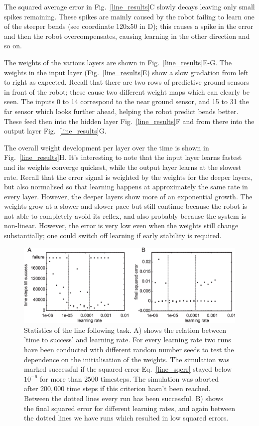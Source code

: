 \documentclass{aamas2018}
\begin{document}
The squared average error in Fig.~\ref{line_results}C slowly decays
leaving only small spikes remaining. These spikes are mainly caused by 
the robot failing to learn one of the steeper bends (see
coordinate 120x50 in D); this causes a spike in the error and
then the robot overcompensates, causing learning in the
other direction and so on.

The weights of the various layers are shown in
Fig.~\ref{line_results}E-G.  The weights in the input layer
(Fig.~\ref{line_results}E) show a slow gradation  from left to right as
expected. Recall that there are two rows of predictive ground
sensors in front of the robot; these cause two different weight maps
which can clearly be seen. The inputs 0 to 14 correspond to the near
ground sensor, and 15 to 31 the far sensor which looks further ahead, 
helping the robot predict bends better. These feed then into the 
hidden layer Fig.~\ref{line_results}F
and from there into the output layer Fig.~\ref{line_results}G.

The overall weight development per layer over the time 
is shown in Fig.~\ref{line_results}H. It's interesting to note
that the input layer learns fastest and its weights converge
quickest, while the output layer learns at the slowest rate. Recall 
that the error signal is weighted by the weights for the deeper
layers, but also normalised so that learning happens at approximately the
same rate in every layer. However, the deeper layers show more
of an exponential growth. The weights grow at a slower
and slower pace but still continue because the robot is not able to completely
avoid its reflex, and also probably because the system is non-linear.
However, the error is very low even when the weights still change
substantially; one could switch off learning if early stability
is required.



\begin{figure}[!ht]
  \centering
  \includegraphics[width=\columnwidth]{line_stats}
  \caption{Statistics of the line following task. A) shows the relation between
    'time to success' and learning rate. For every learning rate two runs have
    been conducted with different random number seeds to test the dependence on the
    initialisation of the weights. The simulation was marked successful if the
    squared error Eq.~\ref{line_sqerr} stayed below $10^{-6}$ for more than $2500$
    timesteps. The simulation was aborted after $200,000$ time steps if this criterion
    hasn't been reached. Between the dotted lines every run has been successful.
    B) shows the final squared error for different learning rates, and again between
    the dotted lines we have runs which resulted in low squared errors.
    \label{line_stats}}
\end{figure}
\end{document}
